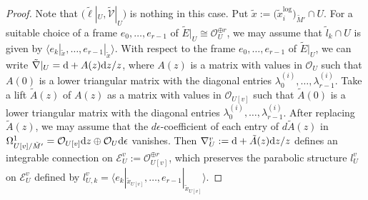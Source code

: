 \documentclass[pdftex]{sigma}
\numberwithin{equation}{section}
\begin{document}
\begin{proof}
Note that $\big(\tilde{\ell}|_U,\tilde{\mathcal V}|_U\big)$ is nothing in this case.
Put $\tilde{x}:=\big(\tilde{x}^{\mathrm{log}}_i\big)_{\tilde{M}'}\cap U$.
For a suitable choice of a frame
$e_0,\dots,e_{r-1}$ of $\tilde{E}|_U\cong{\mathcal O}_U^{\oplus r}$,
we may assume that $\tilde{l}_k\cap U$ is given by
$\langle e_k|_{\tilde{x}},\dots,e_{r-1}|_{\tilde{x}} \rangle$.
With respect to the frame $e_0,\dots,e_{r-1}$ of $\tilde{E}|_U$, we can write
$\tilde{\nabla}|_U={\rm d}+A(z){\rm d}z/z$,
where $A(z)$ is a matrix with values in ${\mathcal O}_U$
such that $A(0)$ is a lower triangular matrix with the diagonal entries
$\lambda^{(i)}_0,\dots,\lambda^{(i)}_{r-1}$.
Take a lift $\tilde{A}(z)$ of $A(z)$ as a matrix with values in
${\mathcal O}_{U[v]}$ such that
$\tilde{A}(0)$ is a lower triangular matrix with the diagonal entries
$\lambda^{(i)}_0,\dots,\lambda^{(i)}_{r-1}$.
After replacing $\tilde{A}(z)$, we may assume that the $d\epsilon$-coefficient
of each entry of $d\tilde{A}(z)$ in
$\Omega^1_{U[v]/\tilde{M}'}={\mathcal O}_{U[v]}{\rm d}z\oplus{\mathcal O}_U {\rm d}\epsilon$
vanishes.
Then $\nabla^v_U:={\rm d}+\tilde{A}(z){\rm d}z/z$ defines an integrable connection
on ${\mathcal E}^v_U:={\mathcal O}_{U[v]}^{\oplus r}$,
which preserves the parabolic structure $l^v_U$
on ${\mathcal E}^v_U$ defined by
$l^v_{U,k}=\langle e_k|_{\tilde{x}_{U[v]}},\dots,e_{r-1}|_{\tilde{x}_{U[v]}}\rangle$.


\end{proof}
\end{document}
